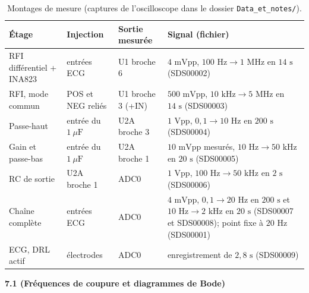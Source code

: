 \documentclass[11pt,letterpaper]{article}
\newcommand{\question}[1]{\needspace{12\baselineskip}\par\medskip\noindent\textbf{#1}\par\smallskip}
\begin{document}
\begin{table}[H]
\centering
\caption{Montages de mesure (captures de l'oscilloscope dans le dossier \texttt{Data\_et\_notes/}).}
\label{tab:montages}
\small
\begin{tabular}{L{3.4cm}L{2.8cm}L{2.6cm}L{5.8cm}}
\toprule
\textbf{Étage} & \textbf{Injection} & \textbf{Sortie mesurée} & \textbf{Signal (fichier)} \\
\midrule
RFI différentiel + INA823 & entrées ECG & U1 broche 6 & $4\text{ mVpp}$, $100\text{ Hz} \to 1\text{ MHz}$ en $14\text{ s}$ (SDS00002) \\
RFI, mode commun & POS et NEG reliés & U1 broche 3 (+IN) & $500\text{ mVpp}$, $10\text{ kHz} \to 5\text{ MHz}$ en $14\text{ s}$ (SDS00003) \\
Passe-haut & entrée du $1\ \mu\text{F}$ & U2A broche 3 & $1\text{ Vpp}$, $0,1 \to 10\text{ Hz}$ en $200\text{ s}$ (SDS00004) \\
Gain et passe-bas & entrée du $1\ \mu\text{F}$ & U2A broche 1 & $10\text{ mVpp}$ mesurés, $10\text{ Hz} \to 50\text{ kHz}$ en $20\text{ s}$ (SDS00005) \\
RC de sortie & U2A broche 1 & ADC0 & $1\text{ Vpp}$, $100\text{ Hz} \to 50\text{ kHz}$ en $2\text{ s}$ (SDS00006) \\
Chaîne complète & entrées ECG & ADC0 & $4\text{ mVpp}$, $0,1 \to 20\text{ Hz}$ en $200\text{ s}$ et $10\text{ Hz} \to 2\text{ kHz}$ en $20\text{ s}$ (SDS00007 et SDS00008); point fixe à $20\text{ Hz}$ (SDS00001) \\
ECG, DRL actif & électrodes & ADC0 & enregistrement de $2,8\text{ s}$ (SDS00009) \\
\bottomrule
\end{tabular}
\end{table}

\question{7.1 (Fréquences de coupure et diagrammes de Bode)}
\end{document}
